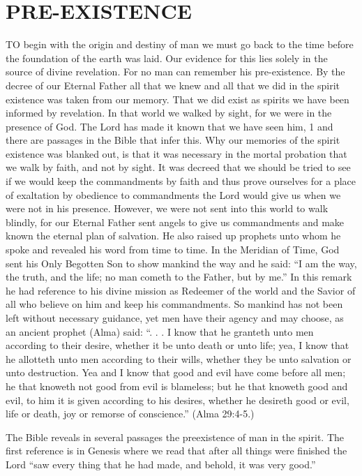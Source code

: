 \chapter{PRE-EXISTENCE}

TO begin with the origin and destiny of man we must go back to the time before the
foundation of the earth was laid. Our evidence for this lies solely in the source of divine
revelation. For no man can remember his pre-existence. By the decree of our Eternal Father
all that we knew and all that we did in the spirit existence was taken from our memory. That
we did exist as spirits we have been informed by revelation. In that world we walked by
sight, for we were in the presence of God. The Lord has made it known that we have seen
him, 1 and there are passages in the Bible that infer this. Why our memories of the spirit
existence was blanked out, is that it was necessary in the mortal probation that we walk by
faith, and not by sight. It was decreed that we should be tried to see if we would keep the
commandments by faith and thus prove ourselves for a place of exaltation by obedience to
commandments the Lord would give us when we were not in his presence. However, we
were not sent into this world to walk blindly, for our Eternal Father sent angels to give us
commandments and make known the eternal plan of salvation. He also raised up prophets
unto whom he spoke and revealed his word from time to time. In the Meridian of Time, God
sent his Only Begotten Son to show mankind the way and he said: ``I am the way, the truth,
and the life; no man cometh to the Father, but by me.'' In this remark he had reference to his
divine mission as Redeemer of the world and the Savior of all who believe on him and keep
his commandments. So mankind has not been left without necessary guidance, yet men have
their agency and may choose, as an ancient prophet (Alma) said: ``. . . I know that he granteth
unto men according to their desire, whether it be unto death or unto life; yea, I know that he
allotteth unto men according to their wills, whether they be unto salvation or unto
destruction. Yea and I know that good and evil have come before all men; he that knoweth
not good from evil is blameless; but he that knoweth good and evil, to him it is given
according to his desires, whether he desireth good or evil, life or death, joy or remorse of
conscience.'' (Alma 29:4-5.)

The Bible reveals in several passages the preexistence of man in the spirit. The first reference
is in Genesis where we read that after all things were finished the Lord ``saw every thing that
he had made, and behold, it was very good.''

